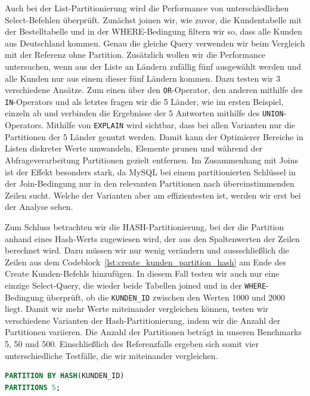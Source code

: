 Auch bei der List-Partitionierung wird die Performance von unterschiedlichen Select-Befehlen überprüft.
Zunächst joinen wir, wie zuvor, die Kundentabelle mit der Bestelltabelle und in der WHERE-Bedingung filtern wir so, dass alle Kunden aus Deutschland kommen.
Genau die gleiche Query verwenden wir beim Vergleich mit der Referenz ohne Partition.
Zusätzlich wollen wir die Performance untersuchen, wenn aus der Liste an Ländern zufällig fünf ausgewählt werden und alle Kunden nur aus einem dieser fünf Ländern kommen.
Dazu testen wir 3 verschiedene Ansätze.
Zum einen über den \texttt{OR}-Operator, den anderen mithilfe des \texttt{IN}-Operators und als letztes fragen wir die 5 Länder, wie im ersten Beispiel, einzeln ab und verbinden die Ergebnisse der 5 Antworten mithilfe des \texttt{UNION}-Operators.
Mithilfe von \texttt{EXPLAIN} wird sichtbar, dass bei allen Varianten nur die Partitionen der 5 Länder genutzt werden.
Damit kann der Optimierer Bereiche in Listen diskreter Werte umwandeln, Elemente prunen und während der Abfrageverarbeitung Partitionen gezielt entfernen.
Im Zusammenhang mit Joins ist der Effekt besonders stark, da MySQL bei einem partitionierten Schlüssel in der Join-Bedingung nur in den relevanten Partitionen nach übereinstimmenden Zeilen sucht.
Welche der Varianten aber am effizientesten ist, werden wir erst bei der Analyse sehen.

Zum Schluss betrachten wir die HASH-Partitionierung, bei der die Partition anhand eines Hash-Werts zugewiesen wird, der aus den Spaltenwerten der Zeilen berechnet wird.
Dazu müssen wir nur wenig verändern und aussschließlich die Zeilen aus dem Codeblock~\ref{lst:create_kunden_partition_hash} am Ende des Create Kunden-Befehls hinzufügen.
In diesem Fall testen wir auch nur eine einzige Select-Query, die wieder beide Tabellen joined und in der \texttt{WHERE}-Bedingung überprüft, ob die \texttt{KUNDEN\_ID} zwischen den Werten 1000 und 2000 liegt.
Damit wir mehr Werte miteinander vergleichen können, testen wir verschiedene Varianten der Hash-Partitionierung, indem wir die Anzahl der Partitionen variieren.
Die Anzahl der Partitionen beträgt in unseren Benchmarks 5, 50 und 500.
Einschließlich des Referenzfalls ergeben sich somit vier unterschiedliche Testfälle, die wir miteinander vergleichen.

\vspace{-5pt}
\begin{lstlisting}[language=SQL,caption=Hash-Partitonierung,label={lst:create_kunden_partition_hash}]
PARTITION BY HASH(KUNDEN_ID)
PARTITIONS 5;
\end{lstlisting}
\vspace{-5pt}

